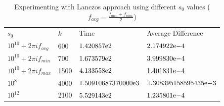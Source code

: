 \begin{table}[!tbh]
 \centering    
\begin{tabular}{ ||p{3.0cm}|p{1.5cm}| p{4cm}| p{4cm}||}
\hline
 $s_{0}$  & $k$ & Time & Average Difference \\ \hhline{|=|=|=|=|} 
 $10^{10} + 2 \pi i f_{avg}$ & 600 & ${1.420857}\mathrm{e}{2}$ & ${2.174922}\mathrm{e}{-4}$ \\
 $10^{10} + 2 \pi i f_{min}$ & 700 & ${1.673579}\mathrm{e}{2}$ & ${3.999830}\mathrm{e}{-4}$ \\
 $10^{10} + 2 \pi i f_{max}$ & 1500& ${4.133558}\mathrm{e}{2}$& ${1.401831}\mathrm{e}{-4}$\\
 $10^{8} $                   &  4000   & ${ 1.50910687370000}\mathrm{e}{3}$& ${1.308395158595435}\mathrm{e}{-3}$ \\
 $10^{12}$                   & 2100 & ${5.529143}\mathrm{e}{2}$& ${1.235801}\mathrm{e}{-4}$\\  
\hline
\end{tabular} 
\caption{Experimenting with Lanczos approach using different $s_{0}$ values ($f_{avg} = \frac{f_{min}+f_{max}}{2}$) }
   \label{tab:s02}
\end{table}